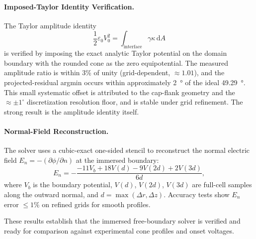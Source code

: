 \paragraph{Imposed-Taylor Identity Verification.} The Taylor amplitude identity
\begin{equation}
\frac{1}{2}\varepsilon_0 V_0^2 = \int_{\text{interface}} \gamma \kappa \, \mathrm{d}A
\end{equation}
is verified by imposing the exact analytic Taylor potential on the domain boundary with the rounded cone as the zero equipotential. The measured amplitude ratio is within 3\% of unity (grid-dependent, $\approx 1.01$), and the projected-residual argmin occurs within approximately \SI{2}{\degree} of the ideal \SI{49.29}{\degree}. This small systematic offset is attributed to the cap-flank geometry and the $\approx\pm1^{\circ}$ discretization resolution floor, and is stable under grid refinement. The strong result is the amplitude identity itself.

\paragraph{Normal-Field Reconstruction.} The solver uses a cubic-exact one-sided stencil to reconstruct the normal electric field $E_n = -(\partial \phi / \partial n)$ at the immersed boundary:
\begin{equation}
E_n = -\frac{-11V_b + 18V(d) - 9V(2d) + 2V(3d)}{6d},
\end{equation}
where $V_b$ is the boundary potential, $V(d)$, $V(2d)$, $V(3d)$ are full-cell samples along the outward normal, and $d = \max(\Delta r, \Delta z)$. Accuracy tests show $E_n$ error $\leq 1\%$ on refined grids for smooth profiles.

These results establish that the immersed free-boundary solver is verified and ready for comparison against experimental cone profiles and onset voltages.
